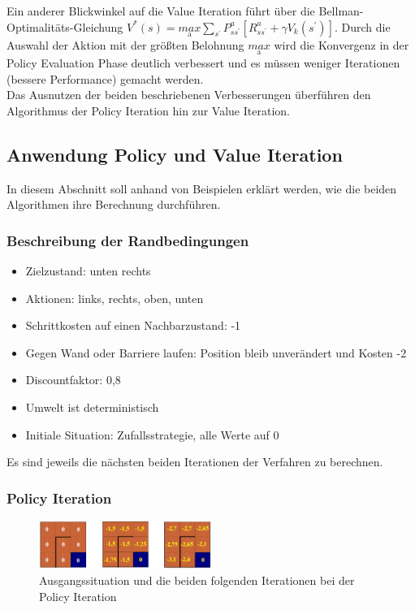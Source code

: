\documentclass[10pt]{scrartcl}
\begin{document}
Ein anderer Blickwinkel auf die Value Iteration führt über die Bellman-Optimalitäts-Gleichung $V^{*}(s) = \underset{\text{a}}{max} \sum_{s^{'}} P^a_{ss^{'}} [R^a_{ss^{'}} + \gamma V_{k} (s^{'})]$.
Durch die Auswahl der Aktion mit der größten Belohnung $\underset{\text{a}}{max}$ wird die Konvergenz in der Policy Evaluation Phase deutlich verbessert und es müssen weniger Iterationen (bessere Performance) gemacht werden.\\

Das Ausnutzen der beiden beschriebenen Verbesserungen überführen den Algorithmus der Policy Iteration hin zur Value Iteration. 

\subsection{Anwendung Policy und Value Iteration}
In diesem Abschnitt soll anhand von Beispielen erklärt werden, wie die beiden Algorithmen ihre Berechnung durchführen.

\subsubsection{Beschreibung der Randbedingungen}
\begin{itemize}
	\item Zielzustand: unten rechts
	\item Aktionen: links, rechts, oben, unten
	\item Schrittkosten auf einen Nachbarzustand: -1
	\item Gegen Wand oder Barriere laufen: Position bleib unverändert und Kosten -2
	\item Discountfaktor: 0,8
	\item Umwelt ist deterministisch
	\item Initiale Situation: Zufallsstrategie, alle Werte auf 0
\end{itemize}

Es sind jeweils die nächsten beiden Iterationen der Verfahren zu berechnen.

\subsubsection{Policy Iteration}
\label{sec:anwendung_policy_iteration}

\begin{figure}[htbp]
	\centering	\includegraphics[width=0.5\textwidth]{Bilder/PolicyIterationAufgabe}
	\caption{Ausgangssituation und die beiden folgenden Iterationen bei der Policy Iteration}
	\label{fig:policy_aufgabe}
\end{figure}
\end{document}
